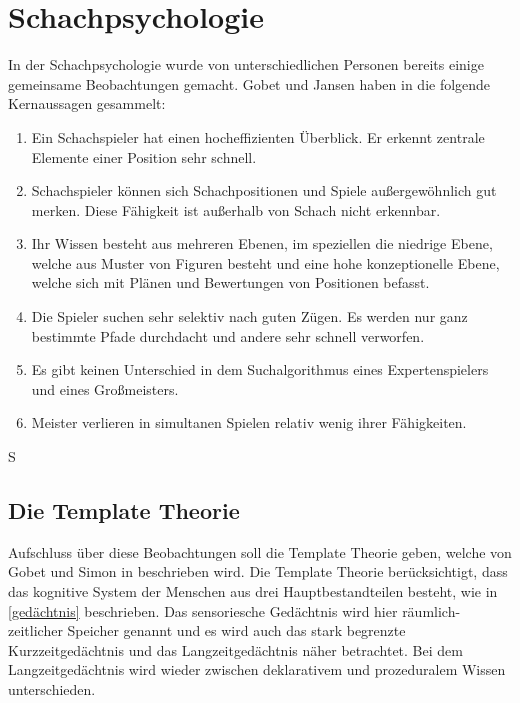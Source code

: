 \section{Schachpsychologie}%
In der Schachpsychologie wurde von unterschiedlichen Personen bereits einige gemeinsame Beobachtungen gemacht. Gobet und Jansen haben in \cite{gobet_training_2006} die folgende Kernaussagen gesammelt:

\begin{enumerate}
    \item Ein Schachspieler hat einen hocheffizienten Überblick. Er erkennt zentrale Elemente einer Position sehr schnell.
    \item Schachspieler können sich Schachpositionen und Spiele außergewöhnlich gut merken. Diese Fähigkeit ist außerhalb von Schach nicht erkennbar.
    \item Ihr Wissen besteht aus mehreren Ebenen, im speziellen die niedrige Ebene, welche aus Muster von Figuren besteht und eine hohe konzeptionelle Ebene, welche sich mit Plänen und Bewertungen von Positionen befasst.
    \item Die Spieler suchen sehr selektiv nach guten Zügen. Es werden nur ganz bestimmte Pfade durchdacht und andere sehr schnell verworfen.
    \item Es gibt keinen Unterschied in dem Suchalgorithmus eines Expertenspielers und eines Großmeisters.
    \item Meister verlieren in simultanen Spielen relativ wenig ihrer Fähigkeiten.
\end{enumerate}
S
\subsection{Die Template Theorie}
Aufschluss über diese Beobachtungen soll die Template Theorie geben, welche von Gobet und Simon in \cite{gobet_templates_1996} beschrieben wird. Die Template Theorie berücksichtigt, dass das kognitive System der Menschen aus drei Hauptbestandteilen besteht, wie in \autoref{gedächtnis} beschrieben.
Das sensoriesche Gedächtnis wird hier räumlich-zeitlicher Speicher genannt und es wird auch das stark begrenzte Kurzzeitgedächtnis und das Langzeitgedächtnis näher betrachtet.
Bei dem Langzeitgedächtnis wird wieder zwischen deklarativem und prozeduralem Wissen unterschieden.
\cite{gobet_training_2006}

